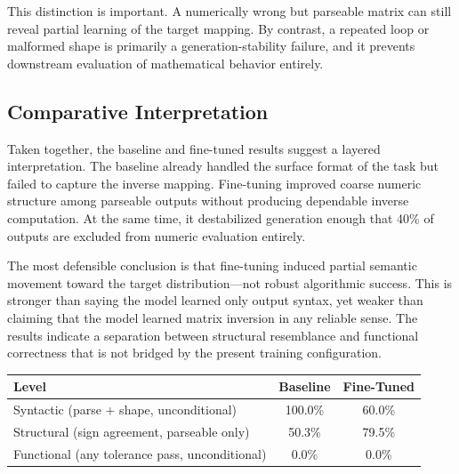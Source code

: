 This distinction is important. A numerically wrong but parseable matrix can still reveal partial learning of the target mapping. By contrast, a repeated loop or malformed shape is primarily a generation-stability failure, and it prevents downstream evaluation of mathematical behavior entirely.

\subsection{Comparative Interpretation}

Taken together, the baseline and fine-tuned results suggest a layered interpretation. The baseline already handled the surface format of the task but failed to capture the inverse mapping. Fine-tuning improved coarse numeric structure among parseable outputs without producing dependable inverse computation. At the same time, it destabilized generation enough that 40\% of outputs are excluded from numeric evaluation entirely.

The most defensible conclusion is that fine-tuning induced partial semantic movement toward the target distribution---not robust algorithmic success. This is stronger than saying the model learned only output syntax, yet weaker than claiming that the model learned matrix inversion in any reliable sense. The results indicate a separation between structural resemblance and functional correctness that is not bridged by the present training configuration.

\begin{center}
\begin{tabular}{lcc}
\toprule
\textbf{Level} & \textbf{Baseline} & \textbf{Fine-Tuned} \\
\midrule
Syntactic (parse + shape, unconditional) & 100.0\% & 60.0\% \\
Structural (sign agreement, parseable only) & 50.3\% & 79.5\% \\
Functional (any tolerance pass, unconditional) & 0.0\% & 0.0\% \\
\bottomrule
\end{tabular}
\end{center}

